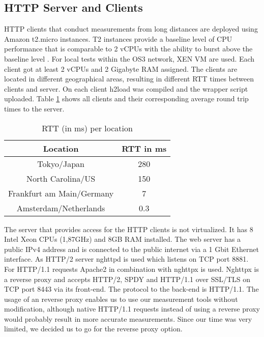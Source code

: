 \subsection{HTTP Server and Clients}
\label{subsec:server_client}
HTTP clients that conduct measurements from long distances are deployed using Amazon t2.micro instances. T2 instances provide a baseline level of CPU performance that is comparable to 2 vCPUs with the ability to burst above the baseline level \cite{amazon-ts}. For local tests within the OS3 network, XEN VM are used. Each client got at least 2 vCPUs and 2 Gigabyte RAM assigned. The clients are located in different geographical areas, resulting in different RTT times between clients and server. On each client h2load was compiled and the wrapper script uploaded. Table \ref{table:locations} shows all clients and their corresponding average round trip times to the server.
\\
\begin{table}[h]
	\centering
\begin{tabular}{ | c | c | }

\hline
\textbf{Location} & \textbf{RTT in ms}\\ \hline \hline
Tokyo/Japan &  280\\ \hline
North Carolina/US &  150\\ \hline 
Frankfurt am Main/Germany &  7\\ \hline
Amsterdam/Netherlands &  0.3\\

\hline
\end{tabular}
\caption{RTT (in ms) per location}
\label{table:locations}
\end{table}


The server that provides access for the HTTP clients is not virtualized. It has 8 Intel Xeon CPUs (1,87GHz) and 8GB RAM installed. The web server has a public IPv4 address and is connected to the public internet via a 1 Gbit Ethernet interface. As HTTP/2 server nghttpd \cite{nghttp} is used which listens on TCP port 8881. For HTTP/1.1 requests Apache2 \cite{apache2} in combination with nghttpx \cite{nghttpx} is used. Nghttpx is a reverse proxy and accepts HTTP/2, SPDY and HTTP/1.1 over SSL/TLS on TCP port 8443 via its front-end. The protocol to the back-end is HTTP/1.1. The usage of an reverse proxy enables us to use our measurement tools without modification, although native HTTP/1.1 requests instead of using a reverse proxy would probably result in more accurate measurements. Since our time was very limited, we decided us to go for the reverse proxy option.

